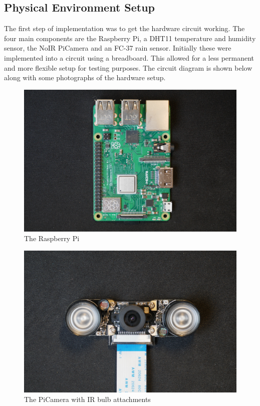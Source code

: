 \documentclass[10pt,a4paper]{article}
\begin{document}
\subsection{Physical Environment Setup}
The first step of implementation was to get the hardware circuit working. The four main components are the Raspberry Pi, a DHT11 temperature and humidity sensor, the NoIR PiCamera and an FC-37 rain sensor. Initially these were implemented into a circuit using a breadboard. This allowed for a less permanent and more flexible setup for testing purposes. The circuit diagram is shown below along with some photographs of the hardware setup. 

\begin{figure}[H]
  \centering
    \includegraphics[width=\linewidth]{images/RPi.jpg}
    \caption{The Raspberry Pi}
    \label{fig:Raspberry Pi}
\end{figure}

\begin{figure}[H]
  \centering
    \includegraphics[width=\linewidth]{images/piCam.jpg}
    \caption{The PiCamera with IR bulb attachments}
    \label{fig:piCam}
\end{figure}
\end{document}
